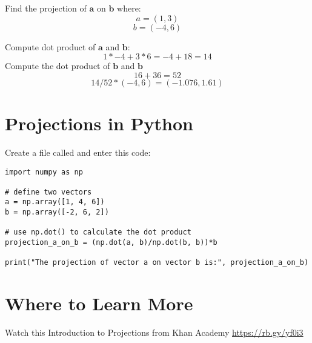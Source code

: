 \begin{Exercise}[title={Projections}, label=projections]
	Find the projection of $\mathbf{a}$ on $\mathbf{b}$ where:
	$$a = (1,3)$$
	$$b = (-4,6)$$
\end{Exercise}
\begin{Answer}[ref=projections]
	Compute dot product of $\mathbf{a}$ and $\mathbf{b}$:
	$$1*-4 + 3*6 = -4 +18 = 14$$
	Compute the dot product of $\mathbf{b}$ and $\mathbf{b}$
	$$16 + 36 = 52 $$
	$$14/52 * (-4,6) = (-1.076 , 1.61)$$
\end{Answer}
 
\section{Projections in Python}

Create a file called  and enter this code:
\begin{Verbatim}
import numpy as np

# define two vectors  
a = np.array([1, 4, 6])   
b = np.array([-2, 6, 2])  
  
# use np.dot() to calculate the dot product
projection_a_on_b = (np.dot(a, b)/np.dot(b, b))*b
  
print("The projection of vector a on vector b is:", projection_a_on_b)
\end{Verbatim}
 
\section{Where to Learn More}

Watch this Introduction to Projections from Khan Academy 
\url{https://rb.gy/yf0i3}

